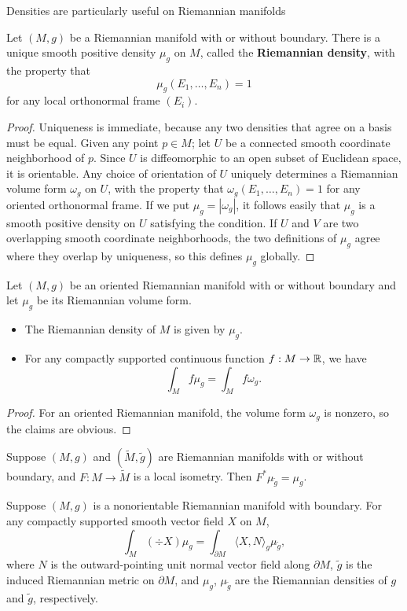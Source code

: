 Densities are particularly useful on Riemannian manifolds
\begin{proposition}
Let $(M,g)$ be a Riemannian manifold with or without boundary. There is a unique smooth positive density $\mu_g$ 
on $M$, called the \textbf{Riemannian density}, with the property that
\[\mu_g(E_1,\dots,E_n)=1\]
for any local orthonormal frame $(E_i)$.
\end{proposition}
\begin{proof}
Uniqueness is immediate, because any two densities that agree on a basis must be equal. Given any point $p\in M$; let $U$ be a connected 
smooth coordinate neighborhood of $p$. Since $U$ is diffeomorphic to an open subset of Euclidean space, it is orientable. Any choice of 
orientation of $U$ uniquely determines a Riemannian volume form $\omega_g$ on $U$, with the property that $\omega_g(E_1,\dots,E_n)=1$ for 
any oriented orthonormal frame. If we put $\mu_g=|\omega_g|$, it follows easily that $\mu_g$ is a smooth positive density on $U$ satisfying 
the condition. If $U$ and $V$ are two overlapping smooth coordinate neighborhoods, the two definitions of $\mu_g$ agree where they overlap by
 uniqueness, so this defines $\mu_g$ globally.
\end{proof}
\begin{proposition}
Let $(M,g)$ be an oriented Riemannian manifold with or without boundary and let $\mu_g$ be its Riemannian volume form.
\begin{itemize}
\item The Riemannian density of $M$ is given by $\mu_g$.
\item For any compactly supported continuous function $f:M\to\mathbb{R}$, we have
\[\int_Mf\mu_g=\int_Mf\omega_g.\]
\end{itemize}
\end{proposition}
\begin{proof}
For an oriented Riemannian manifold, the volume form $\omega_g$ is nonzero, so the claims are obvious.
\end{proof}
\begin{proposition}
Suppose $(M,g)$ and $(\widetilde{M},\widetilde{g})$ are Riemannian manifolds with or without boundary, and $F:M\to\widetilde{M}$ is a local isometry. 
Then $F^*\mu_{\widetilde{g}}=\mu_g$.
\end{proposition}
\begin{theorem}
Suppose $(M,g)$ is a nonorientable Riemannian manifold with boundary. For any compactly supported smooth vector field $X$ on $M$,
\[\int_M(\div X)\mu_g=\int_{\partial M}\langle X,N\rangle_g\mu_{\widetilde{g}},\]
where $N$ is the outward-pointing unit normal vector field along $\partial M$, $\widetilde{g}$ is the induced Riemannian metric on $\partial M$, and $\mu_g$, $\mu_{\widetilde{g}}$ 
are the Riemannian densities of $g$ and $\widetilde{g}$, respectively.
\end{theorem}
